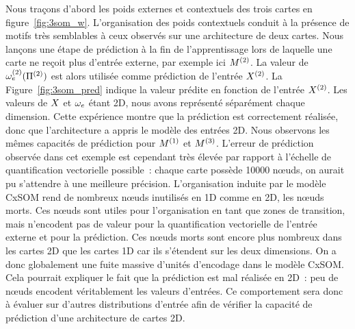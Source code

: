 \documentclass[../main]{subfiles}
\begin{document}
Nous traçons d'abord les poids externes et contextuels des trois cartes en figure~\ref{fig:3som_w}.
L'organisation des poids contextuels conduit à la présence de motifs très semblables à ceux observés sur une architecture de deux cartes.
Nous lançons une étape de prédiction à la fin de l'apprentissage lors de laquelle une carte ne reçoit plus d'entrée externe, par exemple ici $M^{({2})}$.
La valeur de $\omega_{e}^{({2})}(\Pi^{({2})})$ est alors utilisée comme prédiction de l'entrée $X^{({2})}$.
La Figure~\ref{fig:3som_pred} indique la valeur prédite en fonction de l'entrée $X^{({2})}$. 
Les valeurs de $X$ et $\omega_e$ étant 2D, nous avons représenté séparément chaque dimension. Cette expérience montre que la prédiction est correctement réalisée, donc que l'architecture a appris le modèle des entrées 2D. Nous observons les mêmes capacités de prédiction pour $M^{({1})}$ et $M^{({3})}$.
L'erreur de prédiction observée dans cet exemple est cependant très élevée par rapport à l'échelle de quantification vectorielle possible~: chaque carte possède 10000 n\oe{}uds, on aurait pu s'attendre à une meilleure précision.
L'organisation induite par le modèle CxSOM rend de nombreux n\oe{}uds inutilisés en 1D comme en 2D, les n\oe{}uds morts. Ces n\oe{}uds sont utiles pour l'organisation en tant que zones de transition, mais n'encodent pas de valeur pour la quantification vectorielle de l'entrée externe et pour la prédiction. Ces n\oe{}uds morts sont encore plus nombreux dans les cartes 2D que les cartes 1D car ils s'étendent sur les deux dimensions. On a donc globalement une fuite massive d'unités d'encodage dans le modèle CxSOM. Cela pourrait expliquer le fait que la prédiction est mal réalisée en 2D~: peu de n\oe{}uds encodent véritablement les valeurs d'entrées.
Ce comportement sera donc à évaluer sur d'autres distributions d'entrée afin de vérifier la capacité de prédiction d'une architecture de cartes 2D.
\end{document}
